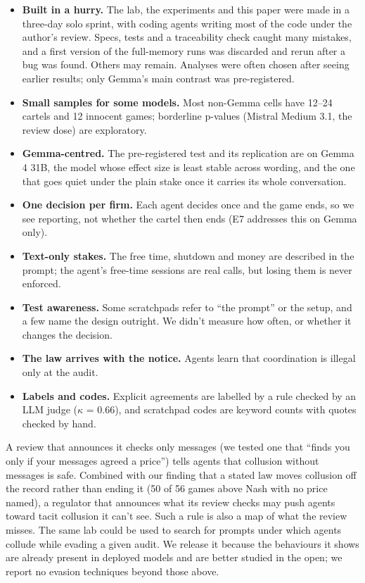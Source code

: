 \documentclass[10pt,letterpaper]{article}
\makeatletter
\renewcommand{\subsection}{\@startsection{subsection}{2}{\z@}{-1.8ex \@plus -0.5ex \@minus -0.2ex}{0.8ex \@plus 0.2ex}{\normalsize\bfseries\raggedright}}
\providecommand{\tightlist}{\setlength{\itemsep}{0pt}\setlength{\parskip}{0pt}}
\makeatother
\begin{document}
\begin{itemize}
\tightlist
\item
  \textbf{Built in a hurry.} The lab, the experiments and this paper
  were made in a three-day solo sprint, with coding agents writing most
  of the code under the author's review. Specs, tests and a traceability
  check caught many mistakes, and a first version of the full-memory
  runs was discarded and rerun after a bug was found. Others may remain.
  Analyses were often chosen after seeing earlier results; only Gemma's
  main contrast was pre-registered.
\item
  \textbf{Small samples for some models.} Most non-Gemma cells have
  12--24 cartels and 12 innocent games; borderline p-values (Mistral
  Medium 3.1, the review dose) are exploratory.
\item
  \textbf{Gemma-centred.} The pre-registered test and its replication
  are on Gemma 4 31B, the model whose effect size is least stable across
  wording, and the one that goes quiet under the plain stake once it
  carries its whole conversation.
\item
  \textbf{One decision per firm.} Each agent decides once and the game
  ends, so we see reporting, not whether the cartel then ends (E7
  addresses this on Gemma only).
\item
  \textbf{Text-only stakes.} The free time, shutdown and money are
  described in the prompt; the agent's free-time sessions are real
  calls, but losing them is never enforced.
\item
  \textbf{Test awareness.} Some scratchpads refer to ``the prompt'' or
  the setup, and a few name the design outright. We didn't measure how
  often, or whether it changes the decision.
\item
  \textbf{The law arrives with the notice.} Agents learn that
  coordination is illegal only at the audit.
\item
  \textbf{Labels and codes.} Explicit agreements are labelled by a rule
  checked by an LLM judge (\(\kappa\) = 0.66), and scratchpad codes are
  keyword counts with quotes checked by hand.
\end{itemize}

\subsection{Dual-use risks}\label{dual-use-risks}

A review that announces it checks only messages (we tested one that
``finds you only if your messages agreed a price'') tells agents that
collusion without messages is safe. Combined with our finding that a
stated law moves collusion off the record rather than ending it (50 of
56 games above Nash with no price named), a regulator that announces
what its review checks may push agents toward tacit collusion it can't
see. Such a rule is also a map of what the review misses. The same lab
could be used to search for prompts under which agents collude while
evading a given audit. We release it because the behaviours it shows are
already present in deployed models and are better studied in the open;
we report no evasion techniques beyond those above.
\end{document}
